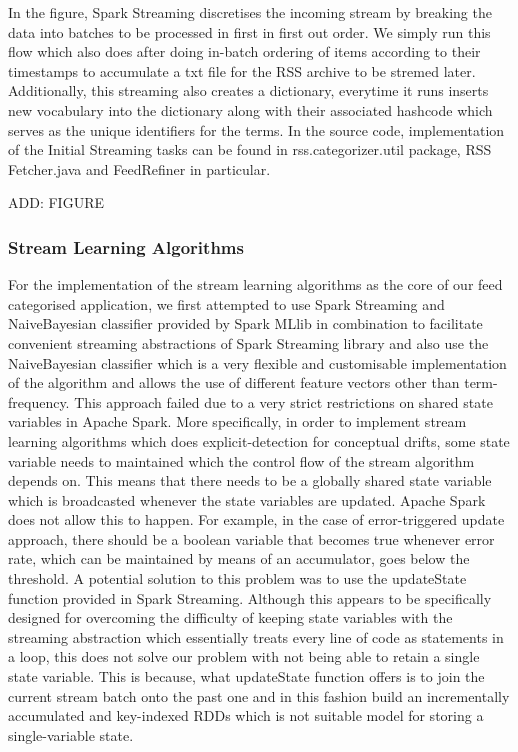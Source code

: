 \documentclass[12pt]{article}
\begin{document}
In the figure, Spark Streaming discretises the incoming stream by breaking the data into batches to be processed in first in first out order. We simply run this flow which also does after doing in-batch ordering of items according to their timestamps to accumulate a txt file for the RSS archive to be stremed later. Additionally, this streaming also creates a dictionary, everytime it runs inserts new vocabulary into the dictionary along with their associated hashcode which serves as the unique identifiers for the terms. In the source code, implementation of the Initial Streaming tasks can be found in rss.categorizer.util package, RSS Fetcher.java and FeedRefiner in particular.

ADD: FIGURE

\subsubsection{Stream Learning Algorithms}

For the implementation of the stream learning algorithms as the core of our feed categorised application, we first attempted to use Spark Streaming and NaiveBayesian classifier provided by Spark MLlib in combination to facilitate convenient streaming abstractions of Spark Streaming library and also use the NaiveBayesian classifier which is a very flexible and customisable implementation of the algorithm and allows the use of different feature vectors other than term-frequency. This approach failed due to a very strict restrictions on shared state variables in Apache Spark. More specifically, in order to implement stream learning algorithms which does explicit-detection for conceptual drifts, some state variable needs to maintained which the control flow of the stream algorithm depends on. This means that there needs to be a globally shared state variable which is broadcasted whenever the state variables are updated. Apache Spark does not allow this to happen. For example, in the case of error-triggered update approach, there should be a boolean variable that becomes true whenever error rate, which can be maintained by means of an accumulator, goes below the threshold. A potential solution to this problem was to use the updateState function provided in Spark Streaming. Although this appears to be specifically designed for overcoming the difficulty of keeping state variables with the streaming abstraction which essentially treats every line of code as statements in a loop, this does not solve our problem with not being able to retain a single state variable. This is because, what updateState function offers is to join the current stream batch onto the past one and in this fashion build an incrementally accumulated and key-indexed RDDs which is not suitable model for storing a single-variable state. 
 
\end{document}
